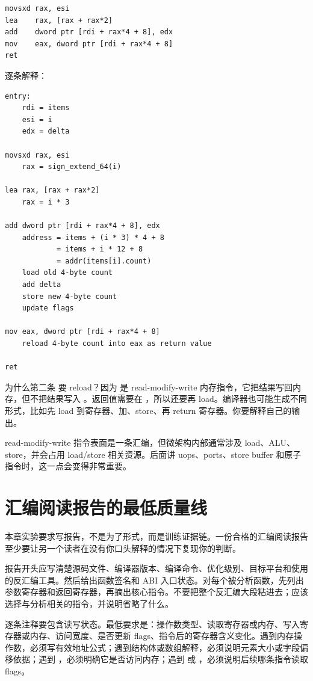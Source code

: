 \begin{lstlisting}
movsxd rax, esi
lea    rax, [rax + rax*2]
add    dword ptr [rdi + rax*4 + 8], edx
mov    eax, dword ptr [rdi + rax*4 + 8]
ret
\end{lstlisting}

逐条解释：

\begin{lstlisting}
entry:
    rdi = items
    esi = i
    edx = delta

movsxd rax, esi
    rax = sign_extend_64(i)

lea rax, [rax + rax*2]
    rax = i * 3

add dword ptr [rdi + rax*4 + 8], edx
    address = items + (i * 3) * 4 + 8
            = items + i * 12 + 8
            = addr(items[i].count)
    load old 4-byte count
    add delta
    store new 4-byte count
    update flags

mov eax, dword ptr [rdi + rax*4 + 8]
    reload 4-byte count into eax as return value

ret
\end{lstlisting}

为什么第二条  要 reload？因为  是 read-modify-write 内存指令，它把结果写回内存，但不把结果写入 。返回值需要在 ，所以还要再 load。编译器也可能生成不同形式，比如先 load 到寄存器、加、store、再 return 寄存器。你要解释自己的输出。

\begin{deepdive}
read-modify-write 指令表面是一条汇编，但微架构内部通常涉及 load、ALU、store，并会占用 load/store 相关资源。后面讲 uops、ports、store buffer 和原子指令时，这一点会变得非常重要。
\end{deepdive}

\section{汇编阅读报告的最低质量线}

本章实验要求写报告，不是为了形式，而是训练证据链。一份合格的汇编阅读报告至少要让另一个读者在没有你口头解释的情况下复现你的判断。

报告开头应写清楚源码文件、编译器版本、编译命令、优化级别、目标平台和使用的反汇编工具。然后给出函数签名和 ABI 入口状态。对每个被分析函数，先列出参数寄存器和返回寄存器，再摘出核心指令。不要把整个反汇编大段粘进去；应该选择与分析相关的指令，并说明省略了什么。

逐条注释要包含读写状态。最低要求是：操作数类型、读取寄存器或内存、写入寄存器或内存、访问宽度、是否更新 flags、指令后的寄存器含义变化。遇到内存操作数，必须写有效地址公式；遇到结构体或数组解释，必须说明元素大小或字段偏移依据；遇到 ，必须明确它是否访问内存；遇到  或 ，必须说明后续哪条指令读取 flags。

